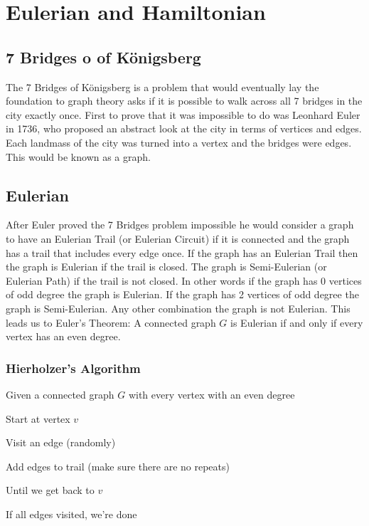 \chapter{Eulerian and Hamiltonian}
\section{7 Bridges o of K\"{o}nigsberg}
The 7 Bridges of K\"{o}nigsberg is a problem that would eventually lay the foundation to graph theory asks if it is possible to walk across all 7 bridges in the city exactly once. First to prove that it was impossible to do was Leonhard Euler in 1736, who proposed an abstract look at the city in terms of vertices and edges. Each landmass of the city was turned into a vertex and the bridges were edges. This would be known as a graph.\cite{7Bridges}
  \begin{center}
  \end{center}

    \section{Eulerian}
  After Euler proved the 7 Bridges problem impossible he would consider a graph to have an Eulerian Trail (or Eulerian Circuit) if it is connected and the graph has a trail that includes every edge once. If the graph has an Eulerian Trail then the graph is Eulerian if the trail is closed. The graph is Semi-Eulerian (or Eulerian Path) if the trail is not closed. In other words if the graph has 0 vertices of odd degree the graph is Eulerian. If the graph has 2 vertices of odd degree the graph is Semi-Eulerian. Any other combination the graph is not Eulerian. This leads us to Euler's Theorem: A connected graph $G$ is Eulerian if and only if every vertex has an even degree.
  \subsection{Hierholzer's Algorithm}
  Given a connected graph $G$ with every vertex with an even degree 

  Start at vertex $v$

  Visit an edge (randomly)

  Add edges to trail (make sure there are no repeats)

  Until we get back to $v$

  If all edges visited, we're done

